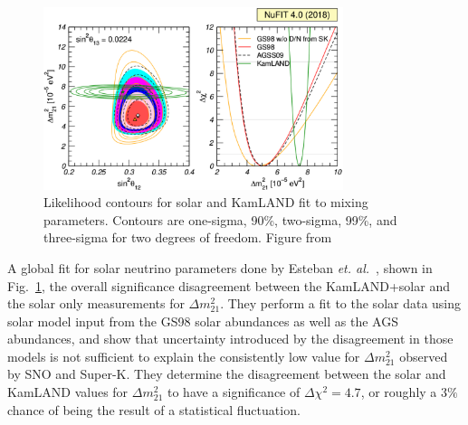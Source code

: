 \begin{figure}[htbp]
    \centering
    \includegraphics[width=0.78\textwidth]{nufit_dm21_tension}
    \caption[Nu-Fit Solar Vs. KamLAND Mixing Parameters]{
        Likelihood contours for solar and KamLAND fit to mixing parameters.
        Contours are one-sigma, 90\%, two-sigma, 99\%, and three-sigma for two
        degrees of freedom. Figure from~\citep{nu_fit4}}
    \label{fig:nufit_dm21_tension}
\end{figure}
A global fit for solar neutrino parameters done by Esteban \textit{et. al.}~\citep{nu_fit4},
shown in Fig.~\ref{fig:nufit_dm21_tension},
the overall significance disagreement between the KamLAND+solar and the solar only
measurements for $\Delta m^{2}_{21}$.
They perform a fit to the solar data using solar model input from the GS98 solar abundances
as well as the AGS abundances, and show that uncertainty introduced by the
disagreement in those models is not sufficient to explain the consistently
low value for $\Delta m^{2}_{21}$ observed by SNO and Super-K.
They determine the disagreement between the solar and KamLAND values for
$\Delta m^{2}_{21}$ to have a significance of $\Delta \chi^{2} = 4.7$, or
roughly a $3\%$ chance of being the result of a statistical fluctuation.


